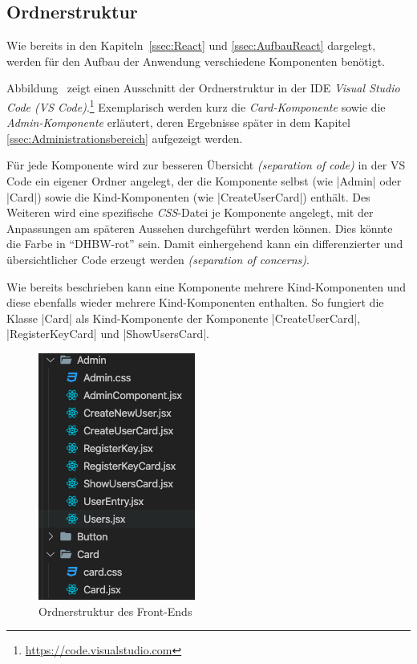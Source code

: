 
\subsection{Ordnerstruktur}
\label{ssec:Ordnerstruktur}

Wie bereits in den Kapiteln~\vref{ssec:React} und \vref{ssec:AufbauReact} dargelegt, werden für den Aufbau der Anwendung verschiedene Komponenten benötigt.

Abbildung~ zeigt einen Ausschnitt der Ordnerstruktur in der \ac{IDE} \emph{Visual Studio Code (VS Code)}.\footnote{\url{https://code.visualstudio.com}}
Exemplarisch werden kurz die \emph{Card-Komponente} sowie die \emph{Admin-Komponente} erläutert, deren Ergebnisse später \ua in dem Kapitel \vref{ssec:Administrationsbereich} aufgezeigt werden.

Für jede Komponente wird \ua zur besseren Übersicht \emph{(separation of code)} in der VS Code ein eigener Ordner angelegt, der die Komponente selbst (wie \zb \jinline|Admin| oder \jinline|Card|) sowie die Kind-Komponenten (wie \zb \jinline|CreateUserCard|) enthält.
Des Weiteren wird eine spezifische \emph{\acs{CSS}}-Datei je Komponente angelegt, mit der Anpassungen am späteren Aussehen durchgeführt werden können.
Dies könnte \zb die Farbe in \enquote{DHBW-rot} sein.
Damit einhergehend kann ein differenzierter und übersichtlicher Code erzeugt werden \emph{(separation of concerns)}.

Wie bereits beschrieben kann eine Komponente mehrere Kind-Komponenten und diese ebenfalls wieder mehrere Kind-Komponenten enthalten.
So fungiert die Klasse \jinline|Card| \ua als Kind-Komponente der Komponente \jinline|CreateUserCard|, \jinline|RegisterKeyCard| und \jinline|ShowUsersCard|.

\begin{figure}[!htb]
	\centering
	\includegraphics[height=0.4\textwidth, keepaspectratio]{img/client/ordnerStruktur.png}
	\captionsetup{justification=centering, format=plain}
	\caption[Ordnerstruktur des Front-Ends]{Ordnerstruktur des Front-Ends \\ \quelleScreenshot}
	\label{fig:OrdnerstrukturVSCode}
\end{figure}

